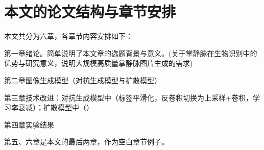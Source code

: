 \section{本文的论文结构与章节安排}

\label{sec:arrangement}

本文共分为六章，各章节内容安排如下：

第一章绪论。简单说明了本文章的选题背景与意义。(关于掌静脉在生物识别中的优势与研究意义，说明大规模高质量掌静脉图片生成的需求)

第二章图像生成模型（对抗生成模型与扩散模型）

第三章技术改进：对抗生成模型中（标签平滑化，反卷积切换为上采样+卷积，学习率衰减）；扩散模型中（）

第四章实验结果

第五、六章是本文的最后两章，作为空白章节例子。

